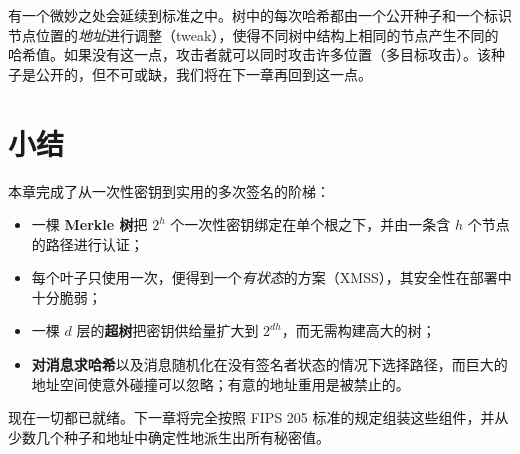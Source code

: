 \begin{remark}[公开种子的作用]
有一个微妙之处会延续到标准之中。树中的每次哈希都由一个公开种子和一个标识节点位置的\emph{地址}进行调整（tweak），使得不同树中结构上相同的节点产生不同的哈希值。如果没有这一点，攻击者就可以同时攻击许多位置（多目标攻击）。该种子是公开的，但不可或缺，我们将在下一章再回到这一点。
\end{remark}

\section{小结}
本章完成了从一次性密钥到实用的多次签名的阶梯：

\begin{itemize}
  \item 一棵 \textbf{Merkle 树}把 $2^h$ 个一次性密钥绑定在单个根之下，并由一条含 $h$ 个节点的路径进行认证；
  \item 每个叶子只使用一次，便得到一个\emph{有状态}的方案（XMSS），其安全性在部署中十分脆弱；
  \item 一棵 $d$ 层的\textbf{超树}把密钥供给量扩大到 $2^{dh}$，而无需构建高大的树；
  \item \textbf{对消息求哈希}以及消息随机化在没有签名者状态的情况下选择路径，而巨大的地址空间使意外碰撞可以忽略；有意的地址重用是被禁止的。
\end{itemize}

现在一切都已就绪。下一章将完全按照 FIPS 205 标准的规定组装这些组件，并从少数几个种子和地址中确定性地派生出所有秘密值。

\printbibliography[heading=chapterrefs]
